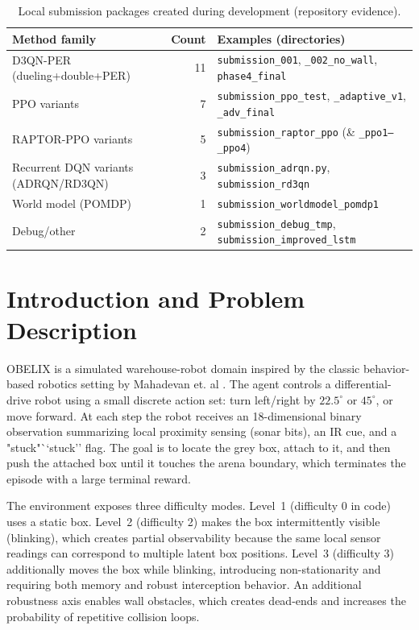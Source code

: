 \documentclass[11pt, oneside]{article}    %
\begin{document}
\begin{table}[H]
\centering
\caption{Local submission packages created during development (repository evidence).}
\label{tab:submission-counts}
\begin{tabular}{lrl}
\toprule
Method family & Count & Examples (directories) \\
\midrule
D3QN-PER (dueling+double+PER) & 11 & \texttt{submission\_001}, \texttt{\_002\_no\_wall}, \texttt{phase4\_final} \\
PPO variants & 7 & \texttt{submission\_ppo\_test}, \texttt{\_adaptive\_v1}, \texttt{\_adv\_final} \\
RAPTOR-PPO variants & 5 & \texttt{submission\_raptor\_ppo} (\& \texttt{\_ppo1--\_ppo4}) \\
Recurrent DQN variants (ADRQN/RD3QN) & 3 & \texttt{submission\_adrqn.py}, \texttt{submission\_rd3qn} \\
World model (POMDP) & 1 & \texttt{submission\_worldmodel\_pomdp1} \\
Debug/other & 2 & \texttt{submission\_debug\_tmp}, \texttt{submission\_improved\_lstm} \\
\bottomrule
\end{tabular}
\end{table}

\section{Introduction and Problem Description}
OBELIX is a simulated warehouse-robot domain inspired by the classic behavior-based robotics setting by Mahadevan et. al \citep{mahadevan1991automatic}. The agent controls a differential-drive robot using a small discrete action set: turn left/right by $22.5^{\circ}$ or $45^{\circ}$, or move forward. At each step the robot receives an 18-dimensional binary observation summarizing local proximity sensing (sonar bits), an IR cue, and a "stuck"``stuck'' flag. The goal is to locate the grey box, attach to it, and then push the attached box until it touches the arena boundary, which terminates the episode with a large terminal reward.

The environment exposes three difficulty modes. Level~1 (difficulty 0 in code) uses a static box. Level~2 (difficulty 2) makes the box intermittently visible (blinking), which creates partial observability because the same local sensor readings can correspond to multiple latent box positions. Level~3 (difficulty 3) additionally moves the box while blinking, introducing non-stationarity and requiring both memory and robust interception behavior. An additional robustness axis enables wall obstacles, which creates dead-ends and increases the probability of repetitive collision loops.
\end{document}
